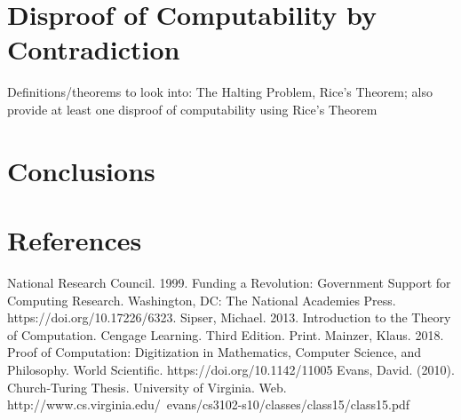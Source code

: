 \documentclass{article}
\begin{document}
\section{Disproof of Computability by Contradiction}
Definitions/theorems to look into: The Halting Problem, Rice's Theorem; also provide at least one disproof of computability using Rice's Theorem

\section{Conclusions}

\section{References}
\begin{thebibliography}{100}
	 National Research Council. 1999. Funding a Revolution: Government Support for Computing Research. Washington, DC: The National Academies Press. https://doi.org/10.17226/6323.
	 Sipser, Michael. 2013. Introduction to the Theory of Computation. Cengage Learning. Third Edition. Print.
	 Mainzer, Klaus. 2018. Proof of Computation: Digitization in Mathematics, Computer Science, and Philosophy. World Scientific. https://doi.org/10.1142/11005
	 Evans, David. (2010). Church-Turing Thesis. University of Virginia. Web. http://www.cs.virginia.edu/~evans/cs3102-s10/classes/class15/class15.pdf
\end{thebibliography}
\end{document}
